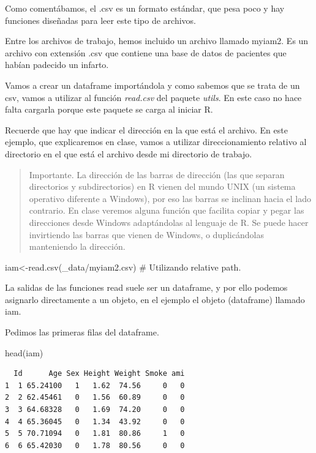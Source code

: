 \documentclass[
  letterpaper,
  DIV=11,
  numbers=noendperiod]{scrreprt}
\newenvironment{Shaded}{\begin{snugshade}}{\end{snugshade}}
\newcommand{\CommentTok}[1]{\textcolor[rgb]{0.37,0.37,0.37}{#1}}
\newcommand{\FunctionTok}[1]{\textcolor[rgb]{0.28,0.35,0.67}{#1}}
\newcommand{\NormalTok}[1]{\textcolor[rgb]{0.00,0.23,0.31}{#1}}
\newcommand{\OtherTok}[1]{\textcolor[rgb]{0.00,0.23,0.31}{#1}}
\newcommand{\StringTok}[1]{\textcolor[rgb]{0.13,0.47,0.30}{#1}}
\begin{document}
Como comentábamos, el .csv es un formato estándar, que pesa poco y hay
funciones diseñadas para leer este tipo de archivos.

Entre los archivos de trabajo, hemos incluido un archivo llamado myiam2.
Es un archivo con extensión .csv que contiene una base de datos de
pacientes que habían padecido un infarto.

Vamos a crear un dataframe importándola y como sabemos que se trata de
un csv, vamos a utilizar al función \emph{read.csv} del paquete
\emph{utils}. En este caso no hace falta cargarla porque este paquete se
carga al iniciar R.

Recuerde que hay que indicar el dirección en la que está el archivo. En
este ejemplo, que explicaremos en clase, vamos a utilizar
direccionamiento relativo al directorio en el que está el archivo desde
mi directorio de trabajo.

\begin{quote}
Importante. La dirección de las barras de dirección (las que separan
directorios y subdirectorios) en R vienen del mundo UNIX (un sistema
operativo diferente a Windows), por eso las barras se inclinan hacia el
lado contrario. En clase veremos alguna función que facilita copiar y
pegar las direcciones desde Windows adaptándolas al lenguaje de R. Se
puede hacer invirtiendo las barras que vienen de Windows, o
duplicándolas manteniendo la dirección.
\end{quote}

\begin{Shaded}
\begin{Highlighting}[]
\NormalTok{iam}\OtherTok{\textless{}{-}}\FunctionTok{read.csv}\NormalTok{(}\StringTok{\textquotesingle{}\_data/myiam2.csv\textquotesingle{}}\NormalTok{) }\CommentTok{\# Utilizando relative path.}
\end{Highlighting}
\end{Shaded}

La salidas de las funciones read suele ser un dataframe, y por ello
podemos asignarlo directamente a un objeto, en el ejemplo el objeto
(dataframe) llamado iam.

Pedimos las primeras filas del dataframe.

\begin{Shaded}
\begin{Highlighting}[]
\FunctionTok{head}\NormalTok{(iam)}
\end{Highlighting}
\end{Shaded}

\begin{verbatim}
  Id      Age Sex Height Weight Smoke ami
1  1 65.24100   1   1.62  74.56     0   0
2  2 62.45461   0   1.56  60.89     0   0
3  3 64.68328   0   1.69  74.20     0   0
4  4 65.36045   0   1.34  43.92     0   0
5  5 70.71094   0   1.81  80.86     1   0
6  6 65.42030   0   1.78  80.56     0   0
\end{verbatim}
\end{document}
